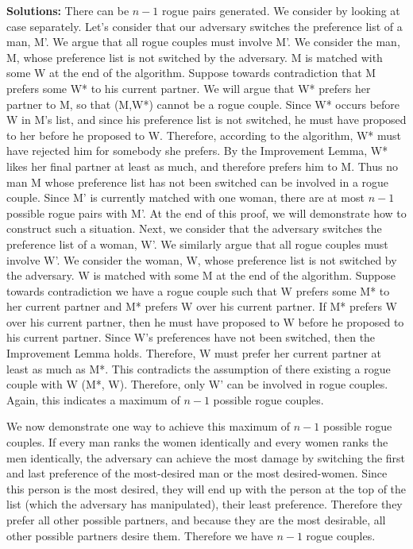 \documentclass[11pt]{article}
\newif\ifsolutions
\begin{document}
\begin{qunlist}
\begin{itemize}
\ifsolutions
\textbf{Solutions:}
There can be $n-1$ rogue pairs generated. We consider by looking at case separately. 
Let's consider that our adversary switches the preference list of a man, M'. 
We argue that all rogue couples must involve M'. 
We consider the man, M, whose preference list is not switched by the adversary. 
M is matched with some W at the end of the algorithm. 
Suppose towards contradiction that M prefers some W* to his current partner. 
We will argue that W* prefers her partner to M, so that (M,W*) cannot be a rogue couple. 
Since W* occurs before W in M's list, and since his preference list is not switched, 
he must have proposed to her before he proposed to W. 
Therefore, according to the algorithm, W* must have rejected him for somebody she prefers. 
By the Improvement Lemma, W* likes her final partner at least as much, and therefore prefers him to M. 
Thus no man M whose preference list has not been switched can be involved in a rogue couple. 
Since M' is currently matched with one woman, there are at most $n-1$ possible rogue pairs with M'. 
At the end of this proof, we will demonstrate how to construct such a situation. 
Next, we consider that the adversary switches the preference list of a woman, W'. 
We similarly argue that all rogue couples must involve W'. 
We consider the woman, W, whose preference list is not switched by the adversary. 
W is matched with some M at the end of the algorithm. 
Suppose towards contradiction we have a rogue couple such that W prefers some M* to her current partner and M* prefers W over his current partner.  
If M* prefers W over his current partner, then he must have proposed to W before he proposed to his current partner. 
Since W's preferences have not been switched, then the Improvement Lemma holds. 
Therefore, W must prefer her current partner at least as much as M*. 
This contradicts the assumption of there existing a rogue couple with W (M*, W). 
Therefore, only W' can be involved in rogue couples. Again, this indicates a maximum of $n-1$ possible rogue couples.

We now demonstrate one way to achieve this maximum of $n-1$ possible rogue couples. 
If every man ranks the women identically and every women ranks the men identically, 
the adversary can achieve the most damage by switching the first and last preference of the most-desired man or the most desired-women. 
Since this person is the most desired, they will end up with the person at the top of the list (which the adversary has manipulated), their least preference. 
Therefore they prefer all other possible partners, and because they are the most desirable, all other possible partners desire them. Therefore we have $n-1$ rogue couples.


\end{itemize}
\end{qunlist}
\end{document}

